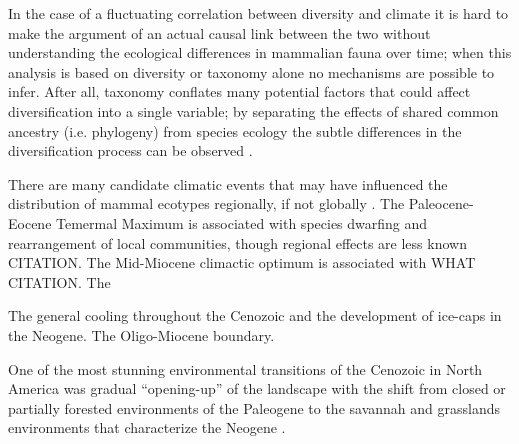 \documentclass[12pt,letterpaper]{article}
\begin{document}
In the case of a fluctuating correlation between diversity and climate it is hard to make the argument of an actual causal link between the two without understanding the ecological differences in mammalian fauna over time; when this analysis is based on diversity or taxonomy alone no mechanisms are possible to infer. After all, taxonomy conflates many potential factors that could affect diversification into a single variable; by separating the effects of shared common ancestry (i.e. phylogeny) from species ecology the subtle differences in the diversification process can be observed \citep{Smits2015b}.

There are many candidate climatic events that may have influenced the distribution of mammal ecotypes regionally, if not globally \citep{Zachos2001,Zachos2008,Janis1993a,Blois2009}. The Paleocene-Eocene Temermal Maximum is associated with species dwarfing and rearrangement of local communities, though regional effects are less known CITATION. The Mid-Miocene climactic optimum is associated with WHAT CITATION. The 

The general cooling throughout the Cenozoic and the development of ice-caps in the Neogene. The Oligo-Miocene boundary. 

One of the most stunning environmental transitions of the Cenozoic in North America was gradual ``opening-up'' of the landscape with the shift from closed or partially forested environments of the Paleogene to the savannah and grasslands environments that characterize the Neogene \citep{Blois2009,Janis1993a,Janis2000,Stromberg2005}.


\end{document}
